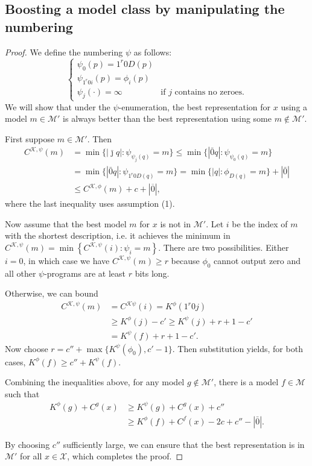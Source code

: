 \documentclass{style/llncs}
\newcommand{\M}{\mathscr M}
\newcommand{\K}{\mathscr K}
\newcommand{\X}{\mathscr X}
\newcommand{\br}[1]{\overline{#1}}
\begin{document}
\subsection{Boosting a model class by manipulating the numbering}

\coolone*

\begin{proof}
We define the numbering $\psi$ as follows:
\[\begin{cases}
\psi_0(p) = 1^r 0 D(p) \\
\psi_{1^r0i}(p) = \phi_i(p) \\
\psi_j(\cdot) = \infty &\text{if $j$ contains no zeroes.}
\end{cases}\]
We will show that under the $\psi$-enumeration, the best representation for $x$ using a model $m\in\M'$ is always better than the best representation using some $m\notin\M'$.

First suppose $m\in\M'$. Then
\begin{align*}
C^{\K,\psi}(m) &=\min\{|\bar\jmath q|:\psi_{\psi_j(q)}=m\}
\leq\min\{|\bar0 q|:\psi_{\psi_0(q)}=m\} \\ 
&=\min\{|\bar0 q|:\psi_{1^r0 D(q)}=m\}  
=\min\{|q|:\phi_{D(q)}=m\} + |\bar 0|\\
&\leq C^{\K,\phi}(m)+c+|\br{0}|,
\end{align*}
where the last inequality uses assumption (1).

Now assume that the best model $m$ for $x$ is not in $\M'$. 
Let $i$ be the index of $m$ with the shortest description, i.e. it achieves the minimum in $C^{\K, \psi}(m)=\min\left\{C^{\K,\psi}(i):\psi_i=m\right\}$.
There are two possibilities. Either $i = 0$, in which case we have $C^{\K,\psi}(m)\ge r$ because $\phi_0$ cannot output zero and all other $\psi$-programs are at least $r$ bits long.

Otherwise, we can bound
\begin{align*}
C^{\K,\psi}(m)&=C^{\K\psi}(i)=K^\phi(1^r0j)\\
&\ge K^\phi(j)-c' \ge K^\psi(j)+r+1-c'\\
&=K^\psi(f)+r+1-c'.
\end{align*}
Now choose $r=c''+\max\{K^\psi(\phi_0),c'-1\}$. Then substitution yields, for both cases, 
$K^\phi(f)\ge c''+K^\psi(f)$.

Combining the inequalities above, for any model $g\not\in\M'$, there is a model $f\in\M$ such that
\[\begin{split}
K^\phi(g)+C^g(x) &\ge K^\psi(g)+C^g(x)+c''\\
&\ge K^\phi(f)+C^f(x) -2c+c'' -|\bar0|.
\end{split}\]

By choosing $c''$ sufficiently large, we can ensure that the best representation is in $\M'$ for all $x\in\X$, which completes the proof.
\end{proof}
\end{document}
